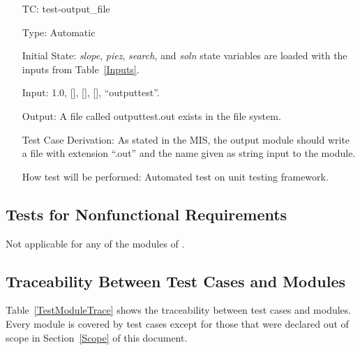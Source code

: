 \documentclass[12pt, titlepage]{article}
\newcounter{utestnum} %
\begin{document}
\begin{enumerate}[label=TC\arabic*:,ref={\arabic*}]
	\item [TC\refstepcounter{utestnum}\theutestnum: \label{TC_OutputFile}] 
	test-output\_file
	
	Type: Automatic
	
	Initial State: \textit{slope}, \textit{piez}, \textit{search}, and 
	\textit{soln} state variables are loaded with the inputs from 
	Table~\ref{Inputs}.
	
	Input: 1.0, [], [], [], ``outputtest''.
	
	Output: A file called outputtest.out exists in the file system.
	
	Test Case Derivation: As stated in the MIS, the output module should write 
	a file with extension ``.out'' and the name given as string input to the 
	module.
	
	How test will be performed: Automated test on unit testing framework.
	
\end{enumerate}

\subsection{Tests for Nonfunctional Requirements}

Not applicable for any of the modules of \progname{}.

\subsection{Traceability Between Test Cases and Modules}

Table~\ref{TestModuleTrace} shows the traceability between test cases and 
modules. Every module is covered by test cases except for those that were 
declared out of scope in Section~\ref{Scope} of this document.
\end{document}

